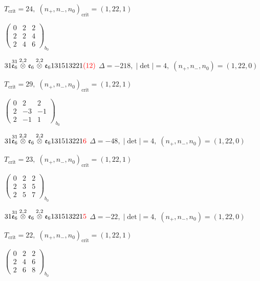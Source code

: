 \documentclass[10pt]{article}
\begin{document}
\hspace{1em}$T_{\text{crit}}=24,\; (n_+,n_-,n_0)_{\text{crit}}=(1,22,1)$

\hspace{2em}$\left(\begin{smallmatrix}0 & 2 & 2 \\ 2 & 2 & 4 \\ 2 & 4 & 6\end{smallmatrix}\right)_{\!b_0}$

$31\overset{31}{\mathfrak{e}_6}\overset{2,2}{\otimes}\mathfrak{e}_6\overset{2,2}{\otimes}\mathfrak{e}_6131513221\textcolor{red}{(12)}$ \quad $\Delta=-218,\; |\det|=4,\; (n_+,n_-,n_0)=(1,22,0)$

\hspace{1em}$T_{\text{crit}}=29,\; (n_+,n_-,n_0)_{\text{crit}}=(1,22,1)$

\hspace{2em}$\left(\begin{smallmatrix}0 & 2 & 2 \\ 2 & -3 & -1 \\ 2 & -1 & 1\end{smallmatrix}\right)_{\!b_0}$

$31\overset{31}{\mathfrak{e}_6}\overset{2,2}{\otimes}\mathfrak{e}_6\overset{2,2}{\otimes}\mathfrak{e}_6131513221\textcolor{red}{6}$ \quad $\Delta=-48,\; |\det|=4,\; (n_+,n_-,n_0)=(1,22,0)$

\hspace{1em}$T_{\text{crit}}=23,\; (n_+,n_-,n_0)_{\text{crit}}=(1,22,1)$

\hspace{2em}$\left(\begin{smallmatrix}0 & 2 & 2 \\ 2 & 3 & 5 \\ 2 & 5 & 7\end{smallmatrix}\right)_{\!b_0}$

$31\overset{31}{\mathfrak{e}_6}\overset{2,2}{\otimes}\mathfrak{e}_6\overset{2,2}{\otimes}\mathfrak{e}_6131513221\textcolor{red}{5}$ \quad $\Delta=-22,\; |\det|=4,\; (n_+,n_-,n_0)=(1,22,0)$

\hspace{1em}$T_{\text{crit}}=22,\; (n_+,n_-,n_0)_{\text{crit}}=(1,22,1)$

\hspace{2em}$\left(\begin{smallmatrix}0 & 2 & 2 \\ 2 & 4 & 6 \\ 2 & 6 & 8\end{smallmatrix}\right)_{\!b_0}$
\end{document}
